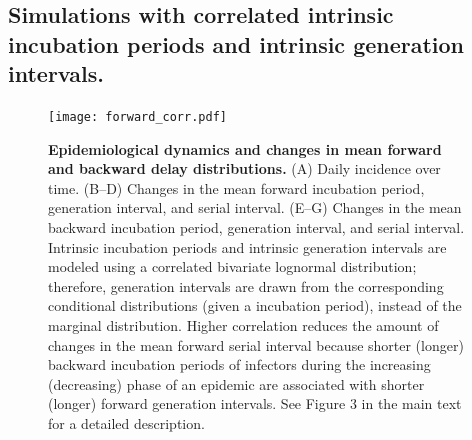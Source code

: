 \documentclass[12pt]{article}
\begin{document}
\renewcommand\thefigure{S\arabic{figure}}    
\setcounter{figure}{0}

\subsection{Simulations with correlated intrinsic incubation periods and intrinsic generation intervals.}

\begin{figure}[!pht]
\begin{center}
\texttt{[image: forward\_corr.pdf]}
\caption{
\textbf{Epidemiological dynamics and changes in mean forward and backward delay distributions.}
(A) Daily incidence over time.
(B--D) Changes in the mean forward incubation period, generation interval, and serial interval.
(E--G) Changes in the mean backward incubation period, generation interval, and serial interval.
Intrinsic incubation periods and intrinsic generation intervals are modeled using a correlated bivariate lognormal distribution; 
therefore, generation intervals are drawn from the corresponding conditional distributions (given a incubation period), instead of the marginal distribution.
Higher correlation reduces the amount of changes in the mean forward serial interval because shorter (longer) backward incubation periods of infectors during the increasing (decreasing) phase of an epidemic are associated with shorter (longer) forward generation intervals.
See Figure 3 in the main text for a detailed description.
}
\end{center}
\end{figure}


\pagebreak


\end{document}
